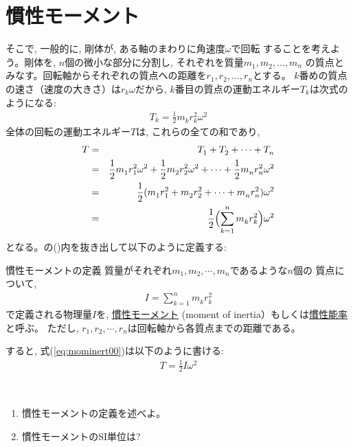 \section{慣性モーメント}

そこで, 一般的に, 剛体が, ある軸のまわりに角速度$\omega$で回転
することを考えよう。剛体を, $n$個の微小な部分に分割し, それぞれを質量$m_1^{\,}, m_2^{\,}, ..., m_n^{\,}$
の質点とみなす。回転軸からそれぞれの質点への距離を$r_1^{\,}, r_2^{\,}, ..., r_n^{\,}$とする。
$k$番めの質点の速さ（速度の大きさ）は$r_k\omega$だから, 
$k$番目の質点の運動エネルギー$T_k^{\,}$は次式のようになる: 
\begin{eqnarray}
T_k=\frac{1}{2}m_k^{\,}r_k^2\omega^2
\end{eqnarray}
全体の回転の運動エネルギー$T$は, これらの全ての和であり, 
\begin{eqnarray}
T&=&T_1^{\,}+T_2^{\,}+\cdots+T_n^{\,}\nonumber\\
 &=&\frac{1}{2}m_1^{\,}r_1^2\omega^2+\frac{1}{2}m_2^{\,}r_2^2\omega^2+\cdots+\frac{1}{2}m_n^{\,}r_n^2\omega^2\nonumber\\
 &=&\frac{1}{2}(m_1^{\,}r_1^2+m_2^{\,}r_2^2+\cdots+m_n^{\,}r_n^2)\omega^2\nonumber\\
 &=&\frac{1}{2}\Bigl(\sum_{k=1}^{n}m_k^{\,}r_k^2\Bigr)\omega^2\label{eq:mominert00}
\end{eqnarray}
となる。の()内を抜き出して以下のように定義する:

\begin{itembox}{慣性モーメントの定義}
質量がそれぞれ$m_1, m_2, \cdots, m_n$であるような$n$個の
質点について,
\begin{eqnarray}
I=\sum_{k=1}^{n}m_k^{\,}r_k^2\label{eq:mominert_def}
\end{eqnarray}
で定義される物理量$I$を, \underline{慣性モーメント}
(moment of inertia）もしくは\underline{慣性能率}と呼ぶ。
ただし, $r_1, r_2, \cdots, r_n$は回転軸から各質点までの距離である。 
\end{itembox}

すると, 式(\ref{eq:mominert00})は以下のように書ける:
\begin{eqnarray}
T=\frac{1}{2}I\omega^2\label{eq:mominert}
\end{eqnarray}

%
\begin{q}\label{q:mominert_def}　
\begin{enumerate}
\item 慣性モーメントの定義を述べよ。
\item 慣性モーメントのSI単位は?
\end{enumerate}
\end{q}

